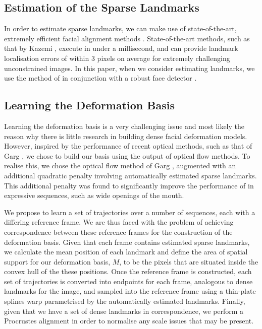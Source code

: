 \subsection{Estimation of the Sparse Landmarks}
In order to estimate sparse landmarks, we can make use of state-of-the-art, extremely
efficient facial alignment methods \cite{kazemi2014one,6909636,menpo14,6909835}.
State-of-the-art methods, such as that by Kazemi \etal \cite{kazemi2014one},
execute in under a millisecond, and can provide landmark localisation errors
of within 3 pixels on average for extremely challenging unconstrained images.
In this paper, when we consider estimating landmarks, we use the method of 
\cite{kazemi2014one} in conjunction with a robust face detector \cite{Zafeiriou20151}.
\subsection{Learning the Deformation Basis}\label{subsec:learning_deformation}
Learning the deformation basis is a very challenging issue and most likely the reason
why there is little research in building dense facial deformation models. However,
inspired by the performance of recent optical methods, such as that of Garg \etal \cite{Garg:2013hu},
we chose to build our basis using the output of optical flow methods. To realise this,
we chose the optical flow method of Garg \etal \cite{Garg:2013hu}, augmented with
an additional quadratic penalty involving automatically estimated sparse landmarks.
This additional penalty was found to significantly improve the performance of 
\cite{Garg:2013hu} in expressive sequences, such as wide openings of the mouth.

We propose to learn a set of trajectories over a number of sequences, each with
a differing reference frame. We are thus faced with the problem
of achieving correspondence between these reference frames for the construction
of the deformation basis. Given that each frame contains estimated sparse landmarks,
we calculate the mean position of each landmark and define the area of spatial support
for our deformation basis, $M$, to be the pixels that are situated inside the
convex hull of the these positions. Once the reference frame is constructed,
each set of trajectories is converted into endpoints for each frame, analogous
to dense landmarks for the image, and sampled into the reference frame using
a thin-plate splines warp parametrised by the automatically estimated landmarks.
Finally, given that we have a set of dense landmarks in correspondence, we perform a 
Procrustes alignment in order to normalise any scale issues that may be present.

